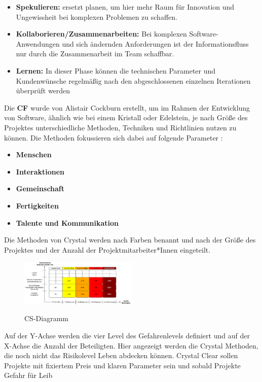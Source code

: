 \begin{itemize}
    \item \textbf{Spekulieren:} ersetzt planen, um hier mehr Raum für Innovation und Ungewissheit bei komplexen Problemen zu schaffen.
    \item \textbf{Kollaborieren/Zusammenarbeiten:} Bei komplexen Software-Anwendungen und sich ändernden Anforderungen ist der Informationsfluss nur durch die Zusammenarbeit im Team schaffbar.
    \item \textbf{Lernen:} In dieser Phase können die technischen Parameter und Kundenwünsche regelmäßig nach den abgeschlossenen einzelnen Iterationen überprüft werden
\end{itemize}
\cite{Alnoukari2008-ro,Abdelaziz2015-lb}
\newline
Die \textbf{CF} wurde von Alistair Cockburn erstellt, um im Rahmen der Entwicklung von Software, ähnlich wie bei einem Kristall oder Edelstein, 
je nach Größe des Projektes unterschiedliche Methoden, Techniken und Richtlinien nutzen zu können. Die Methoden fokussieren sich 
dabei auf folgende Parameter \cite{Ibrahim2020-ip}:
\begin{itemize}
    \item \textbf{Menschen}
    \item \textbf{Interaktionen} 
    \item \textbf{Gemeinschaft}    
    \item \textbf{Fertigkeiten}
    \item \textbf{Talente und Kommunikation }
\end{itemize}
Die Methoden von Crystal werden nach Farben benannt und nach der Größe des Projektes und der Anzahl der Projektmitarbeiter*Innen eingeteilt.
\begin{figure}[h!]
    \centering
    \caption{CS-Diagramm}
        \includegraphics[width=0.5\textwidth]{fig/CSD.png}
        \label{fig:CS-diagram}
    \end{figure}
Auf der Y-Achse werden die vier Level des Gefahrenlevels definiert und auf der X-Achse die Anzahl der Beteiligten. 
Hier angezeigt werden die Crystal Methoden, die noch nicht das Risikolevel Leben abdecken können. 
Crystal Clear sollen Projekte mit fixiertem Preis und klaren Parameter sein und sobald Projekte Gefahr für Leib 
